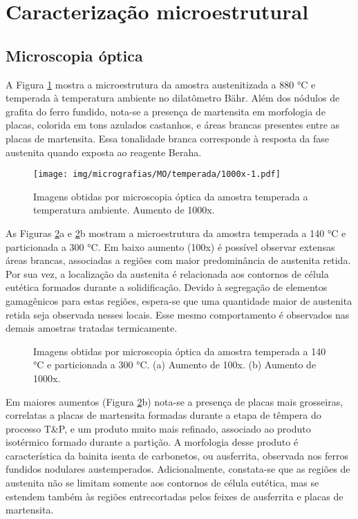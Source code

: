 \section{Caracteriza\c{c}\~{a}o microestrutural}

\label{sec:micros}

\subsection{Microscopia óptica}

A Figura \ref{fig:temperada} mostra a microestrutura da amostra austenitizada a 880 °C e temperada à temperatura ambiente no dilatômetro Bähr. Além dos nódulos de grafita do ferro fundido, nota-se a presença de martensita em morfologia de placas, colorida em tons azulados castanhos, e áreas brancas presentes entre as placas de martensita. Essa tonalidade branca corresponde à resposta da fase austenita quando exposta ao reagente Beraha.

\begin{figure}
	\texttt{[image: img/micrografias/MO/temperada/1000x-1.pdf]}
	\caption{Imagens obtidas por microscopia óptica da amostra temperada a temperatura ambiente. Aumento de 1000x.}
	\label{fig:temperada}
\end{figure}

As Figuras \ref{fig:TT140TP300}a e \ref{fig:TT140TP300}b mostram a microestrutura da amostra temperada a 140 °C e particionada a 300 °C. Em baixo aumento (100x) é possível observar extensas áreas brancas, associadas a regiões com maior predominância de austenita retida. Por sua vez, a localização da austenita é relacionada aos contornos de célula eutética formados durante a solidificação. Devido à segregação de elementos gamagênicos para estas regiões, espera-se que uma quantidade maior de austenita retida seja observada nesses locais. Esse mesmo comportamento é observados nas demais amostras tratadas termicamente.

\begin{figure}
	\vspace{0pt}
	\caption{Imagens obtidas por microscopia óptica da amostra temperada a 140 °C e particionada a 300 °C. (a) Aumento de 100x. (b) Aumento de 1000x.}
	\label{fig:TT140TP300}
\end{figure}

Em maiores aumentos (Figura \ref{fig:TT140TP300}b) nota-se a presença de placas mais grosseiras, correlatas a placas de martensita formadas durante a etapa de têmpera do processo T\&P, e um produto muito mais refinado, associado ao produto isotérmico formado durante a partição. A morfologia desse produto é característica da bainita isenta de carbonetos, ou ausferrita, observada nos ferros fundidos nodulares austemperados. Adicionalmente, constata-se que as regiões de austenita não se limitam somente aos contornos de célula eutética, mas se estendem também às regiões entrecortadas pelos feixes de ausferrita e placas de martensita.

